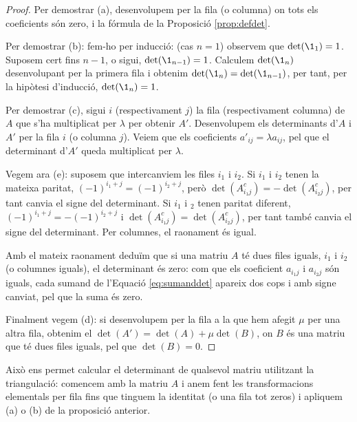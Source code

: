 \begin{proof}
	Per demostrar (a), desenvolupem per la fila (o columna) on tots els coeficients són zero, i la fórmula de la Proposició \ref{prop:defdet}.
	
	Per demostrar (b): fem-ho per inducció: (cas $n=1$) observem que $\det(\1_1)=1$. Suposem cert fins $n-1$, o sigui, $\det(\1_{n-1})=1$. Calculem $\det(\1_n)$  desenvolupant per la primera fila i obtenim $\det(\1_n)=\det(\1_{n-1})$, per tant, per la hipòtesi d'inducció, $\det(\1_n)=1$.
	
	Per demostrar (c), sigui $i$ (respectivament $j$) la fila (respectivament columna) de $A$ que s'ha multiplicat per $\lambda$ per obtenir $A'$. Desenvolupem els determinants d'$A$ i $A'$ per la fila $i$ (o columna $j$). Veiem que els coeficients $a'_{ij}=\lambda a_{ij}$, pel que el determinant d'$A'$ queda multiplicat per $\lambda$.
	
	Vegem ara (e): suposem que intercanviem les files $i_1$ i $i_2$. Si $i_1$ i $i_2$ tenen la mateixa paritat, $(-1)^{i_1+j}=(-1)^{i_2+j}$, però $\det(A_{i_1j}^c)=-\det(A_{i_2j}^c)$, per tant canvia el signe del determinant. Si $i_1$ i $_2$ tenen paritat diferent, $(-1)^{i_1+j}=-(-1)^{i_2+j}$ i $\det(A_{i_1j}^c)=\det(A_{i_2j}^c)$, per tant també canvia el signe del determinant. Per columnes, el raonament és igual.
	
	Amb el mateix raonament deduïm que si una matriu $A$ té dues files iguals, $i_1$ i $i_2$ (o columnes iguals), el determinant és zero: com que els coeficient $a_{i_1j}$ i $a_{i_2j}$ són iguals, cada sumand de l'Equació \eqref{eq:sumanddet} apareix dos cops i amb signe canviat, pel que la suma és zero. 
	
	Finalment vegem (d): si desenvolupem per la fila a la que hem afegit $\mu$ per una altra fila, obtenim el $\det(A')=\det(A)+\mu\det(B)$, on $B$ és una matriu que té dues files iguals, pel que $\det(B)=0$. 
\end{proof}
Això ens permet calcular el determinant de qualsevol matriu utilitzant la triangulació: comencem amb la matriu $A$ i anem fent les transformacions elementals per fila fins que tinguem la identitat (o una fila tot zeros) i apliquem (a) o (b) de la proposició anterior.
